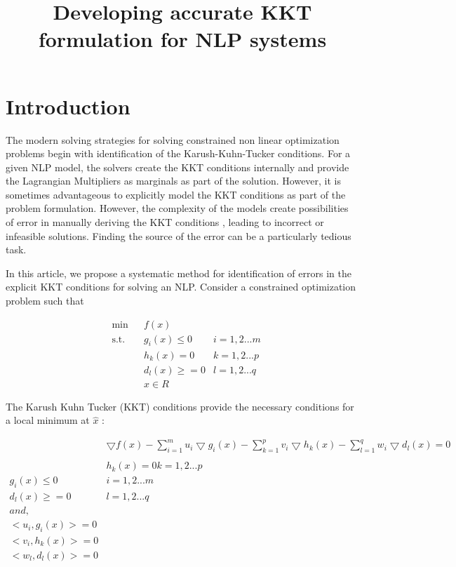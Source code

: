 \documentclass{article}
\title{Developing accurate KKT formulation for NLP systems}
\begin{document}
\section{Introduction}
The modern solving strategies for solving constrained non linear optimization problems begin with identification of the Karush-Kuhn-Tucker conditions. For a given NLP model, the solvers create the KKT conditions internally and provide the Lagrangian Multipliers as marginals as part of the solution. However, it is sometimes advantageous to explicitly model the KKT conditions as part of the problem formulation. However, the complexity of the models create possibilities of error in manually deriving the KKT conditions , leading to incorrect or infeasible solutions. Finding the source of the error can be a particularly tedious task. 

In this article, we propose a systematic method for identification of errors in the explicit KKT conditions for solving an NLP. Consider a constrained optimization problem such that 

\begin{equation}
\begin{aligned}
&	\min 
& & f(x) \\
& \text{s.t.} & & 	 g_{i}(x) \leqslant 0	&	i = 1,2...m \\
& & &			h_{k}(x) = 0	 &	k = 1,2...p \\
& & &			d_{l}(x) \geqslant =0		&	l = 1,2...q \\
& & &			x \in \!R
\end{aligned}
\end{equation} 



The Karush Kuhn Tucker (KKT) conditions provide the necessary conditions for a local minimum at $\hat{x}$ :

\begin{equation}
\begin{aligned}
& \bigtriangledown{f(x)} - \sum_{i=1}^{m} u_{i} \bigtriangledown{g_{i}(x)} 
			- \sum_{k=1}^{p} v_{i} \bigtriangledown{h_{k}(x)} - \sum_{l=1}^{q} w_{i} \bigtriangledown{d_{l}(x)} = 0  \\
\\
& h_{k}(x) = 0   k = 1,2...p  \\	
g_{i}(x) \leqslant 0&	 i = 1,2...m \\  d_{l}(x) \geqslant =0	&	l = 1,2...q
\\
and,\\
<u_{i},g_{i}(x)> = 0 \\ <v_{i},h_{k}(x)> =0 \\  <w_{l},d_{l}(x)> =0
\end{aligned}
\end{equation}
\end{document}
